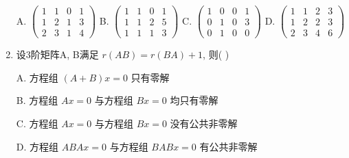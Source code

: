 \documentclass[UTF8]{ctexart}
\begin{document}
\begin{enumerate}
    A. $\begin{pmatrix}1&1&0&1\\ 1&2&1&3\\ 2&3&1&4\end{pmatrix}$ \quad B. $\begin{pmatrix}1&1&0&1\\ 1&1&2&5\\ 1&1&1&3\end{pmatrix}$ \quad C. $\begin{pmatrix}1&0&0&1\\ 0&1&0&3\\ 0&1&0&0\end{pmatrix}$ \quad D. $\begin{pmatrix}1&1&2&3\\ 1&2&2&3\\ 2&3&4&6\end{pmatrix}$

\item 设3阶矩阵A, B满足 $r(AB)=r(BA)+1$, 则( \quad )

    A. 方程组 $(A+B)x=0$ 只有零解

    B. 方程组 $Ax=0$ 与方程组 $Bx=0$ 均只有零解

    C. 方程组 $Ax=0$ 与方程组 $Bx=0$ 没有公共非零解

    D. 方程组 $ABAx=0$ 与方程组 $BABx=0$ 有公共非零解

\end{enumerate}
\end{document}
